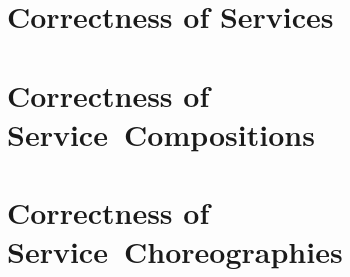 \documentclass[%
  fontsize=10pt,
  abstractoff,
  bibliography=totoc,
  cleardoublepage=empty,
  fleqn,
  footinclude,
  headinclude,
  index=totoc,
  listof=totoc,
  numbers=noenddot,
  open=right,
  titlepage,
  twoside
]{scrbook}
\theoremstyle{mydef}
\begin{document}





{
\setcounter{tocdepth}{1}
\pagestyle{myheadings}
\tableofcontents
}





\part{Correctness of Services}\label{part1}



\part{Correctness of \mbox{Service Compositions}}\label{part2}



\part{Correctness of \mbox{Service Choreographies}}\label{part3}




\makeatletter
\renewcommand\toclevel@chapter{-1}%
\makeatother





\pagestyle{myheadings}







\end{document}
